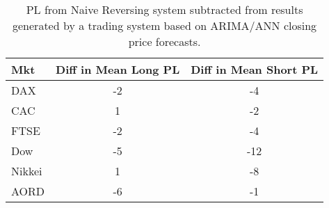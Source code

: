 \begin{table}[ht]
\centering
\caption[ARIMA/ANN closing price system results minus Naive Reversing results]{PL from Naive Reversing system subtracted from results generated by a trading system based on ARIMA/ANN closing price forecasts.} 
\label{tab:chp_ts:arima_ann_sys1_diff}
\begin{tabular}{lcc}
  \toprule Mkt & Diff in Mean Long PL & Diff in Mean Short PL \\ 
  \midrule DAX & -2 & -4 \\ 
  CAC & 1 & -2 \\ 
  FTSE & -2 & -4 \\ 
  Dow & -5 & -12 \\ 
  Nikkei & 1 & -8 \\ 
  AORD & -6 & -1 \\ 
   \bottomrule \end{tabular}
\end{table}
